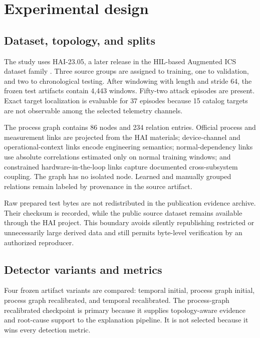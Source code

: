 \section{Experimental design}
\label{sec:experiment}

\subsection{Dataset, topology, and splits}

The study uses HAI-23.05, a later release in the HIL-based Augmented ICS dataset family \citep{shin2020hai,shin2021two}. Three source groups are assigned to training, one to validation, and two to chronological testing. After windowing with length and stride 64, the frozen test artifacts contain 4,443 windows. Fifty-two attack episodes are present. Exact target localization is evaluable for 37 episodes because 15 catalog targets are not observable among the selected telemetry channels.

The process graph contains 86 nodes and 234 relation entries. Official process and measurement links are projected from the HAI materials; device-channel and operational-context links encode engineering semantics; normal-dependency links use absolute correlations estimated only on normal training windows; and constrained hardware-in-the-loop links capture documented cross-subsystem coupling. The graph has no isolated node. Learned and manually grouped relations remain labeled by provenance in the source artifact.

Raw prepared test bytes are not redistributed in the publication evidence archive. Their checksum is recorded, while the public source dataset remains available through the HAI project. This boundary avoids silently republishing restricted or unnecessarily large derived data and still permits byte-level verification by an authorized reproducer.

\subsection{Detector variants and metrics}

Four frozen artifact variants are compared: temporal initial, process graph initial, process graph recalibrated, and temporal recalibrated. The process-graph recalibrated checkpoint is primary because it supplies topology-aware evidence and root-cause support to the explanation pipeline. It is not selected because it wins every detection metric.

